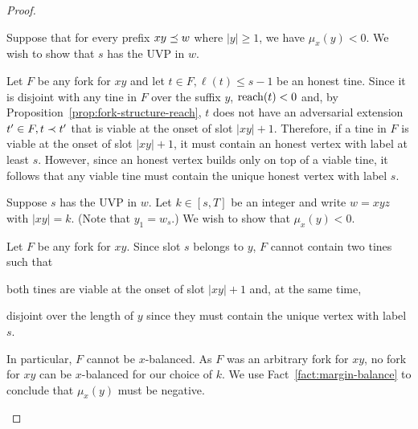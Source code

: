 \begin{proof}~

  \begin{description}[font=\normalfont\itshape\space]
    \item[The $\Longleftarrow$ direction.]
      Suppose that 
      for every prefix $xy \preceq w$ where $|y| \geq 1$, 
      we have $\mu_x(y) < 0$. 
      We wish to show that $s$ has the UVP in $w$.

      Let $F$ be any fork for $xy$ 
      and let 
      $t \in F, \ell(t) \leq s - 1$ be an honest tine. 
      Since it is disjoint with any tine in $F$ over the suffix $y$, 
      $\operatorname{reach}(t) < 0$ and, by Proposition~\ref{prop:fork-structure-reach}, 
      $t$ does not have an adversarial extension $t' \in F, t \prec t'$ that is 
      viable at the onset of slot $|xy| + 1$. 
      Therefore, if a tine in $F$ 
      is viable at the onset of slot $|xy| + 1$, 
      it must contain an honest vertex with label at least $s$. 
      However, since an honest vertex builds only on top of a viable tine, 
      it follows that any viable tine must contain 
      the unique honest vertex with label $s$.

    \item[The $\Longrightarrow$ direction.]
      Suppose $s$ has the UVP in $w$.
      Let $k \in [s, T]$ be an integer and 
      write $w = xyz$ with $|xy| = k$. 
      (Note that $y_1 = w_s$.)
      We wish to show that $\mu_x(y) < 0$.

      Let $F$ be any fork for $xy$.
      Since slot $s$ belongs to $y$, 
      $F$ cannot contain two tines 
      such that 
      \begin{enumerate*}[label=(\roman*)]
        \item both tines are viable at the onset of slot $|xy| + 1$ 
        and, at the same time, 
        \item disjoint over the length of $y$ 
        since they must contain the unique vertex with label $s$. 
      \end{enumerate*}
      In particular, 
      $F$ cannot be $x$-balanced. 
      As $F$ was an arbitrary fork for $xy$, 
      no fork for $xy$ can be $x$-balanced for our choice of $k$.
      We use Fact~\ref{fact:margin-balance} 
      to conclude that 
      $\mu_x(y)$ must be negative.

  \end{description}
\end{proof}



